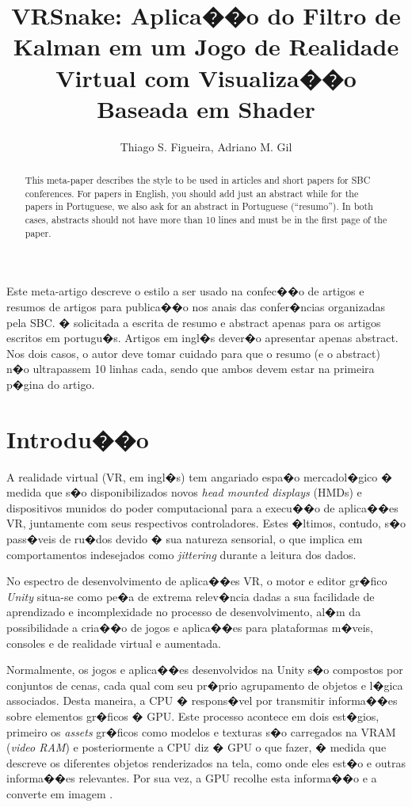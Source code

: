 \documentclass[12pt]{article}
\title{VRSnake: Aplica��o do Filtro de Kalman em um Jogo de Realidade Virtual com Visualiza��o Baseada em Shader}
\author{Thiago S. Figueira\inst{1}, Adriano M. Gil\inst{1} }
\begin{document}
 

\maketitle

\begin{abstract}
  This meta-paper describes the style to be used in articles and short papers
  for SBC conferences. For papers in English, you should add just an abstract
  while for the papers in Portuguese, we also ask for an abstract in
  Portuguese (``resumo''). In both cases, abstracts should not have more than
  10 lines and must be in the first page of the paper.
\end{abstract}
     
\begin{resumo} 
  Este meta-artigo descreve o estilo a ser usado na confec��o de artigos e
  resumos de artigos para publica��o nos anais das confer�ncias organizadas
  pela SBC. � solicitada a escrita de resumo e abstract apenas para os artigos
  escritos em portugu�s. Artigos em ingl�s dever�o apresentar apenas abstract.
  Nos dois casos, o autor deve tomar cuidado para que o resumo (e o abstract)
  n�o ultrapassem 10 linhas cada, sendo que ambos devem estar na primeira
  p�gina do artigo.
\end{resumo}


\section{Introdu��o} \label{sec:introduction}
A realidade virtual (VR, em ingl�s) tem angariado espa�o mercadol�gico � medida que s�o disponibilizados novos \textit{head mounted displays} (HMDs) e dispositivos  munidos do poder computacional para a execu��o de aplica��es VR, juntamente com seus respectivos controladores.  Estes �ltimos, contudo, s�o pass�veis de ru�dos devido � sua natureza sensorial, o que implica  em comportamentos indesejados como \textit{jittering} durante a leitura dos dados.  

No espectro de desenvolvimento de aplica��es VR, o motor e editor gr�fico \textit{Unity} situa-se como pe�a de extrema relev�ncia dadas a sua facilidade de aprendizado e incomplexidade no processo de desenvolvimento, al�m da possibilidade a cria��o de jogos e aplica��es para plataformas m�veis, consoles e de realidade virtual e aumentada.

Normalmente, os jogos e aplica��es desenvolvidos na Unity s�o compostos por conjuntos de cenas, cada qual com seu pr�prio agrupamento de objetos e l�gica associados. Desta maneira, a CPU � respons�vel por transmitir informa��es sobre elementos gr�ficos � GPU. Este processo acontece em dois est�gios, primeiro os \textit{assets} gr�ficos como modelos e texturas s�o carregados na VRAM (\textit{video RAM}) e posteriormente a CPU diz � GPU o que fazer, � medida que descreve os diferentes objetos renderizados na tela, como onde eles est�o e outras informa��es relevantes. Por sua vez, a GPU recolhe esta informa��o e a converte em imagem \cite{akenine2008real}.
\end{document}
